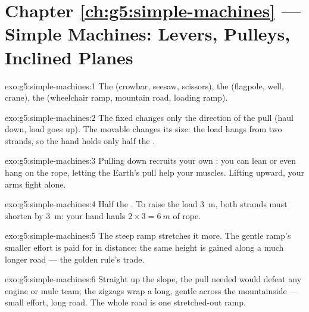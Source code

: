 \section*{Chapter \ref{ch:g5:simple-machines} --- Simple Machines: Levers, Pulleys, Inclined Planes}

\begin{solution}{exo:g5:simple-machines:1}
The  (crowbar, seesaw, scissors), the  (flagpole, well,
crane), the  (wheelchair ramp, mountain road, loading
ramp).
\end{solution}

\begin{solution}{exo:g5:simple-machines:2}
The fixed  changes only the direction of the pull (haul down,
load goes up). The movable  changes its size: the load hangs
from two strands, so the hand holds only half the .
\end{solution}

\begin{solution}{exo:g5:simple-machines:3}
Pulling down recruits your own : you can lean or even hang on
the rope, letting the Earth's pull help your muscles. Lifting
upward, your arms fight alone.
\end{solution}

\begin{solution}{exo:g5:simple-machines:4}
Half the . To raise the load \qty{3}{m}, both strands must
shorten by \qty{3}{m}: your hand hauls $2 \times 3 = \qty{6}{m}$ of
rope.
\end{solution}

\begin{solution}{exo:g5:simple-machines:5}
The steep ramp stretches it more. The gentle ramp's smaller effort
is paid for in distance: the same height is gained along a much
longer road --- the golden rule's trade.
\end{solution}

\begin{solution}{exo:g5:simple-machines:6}
Straight up the slope, the pull needed would defeat any engine or
mule team; the zigzags wrap a long, gentle  across
the mountainside --- small effort, long road. The whole road is one
stretched-out ramp.
\end{solution}

